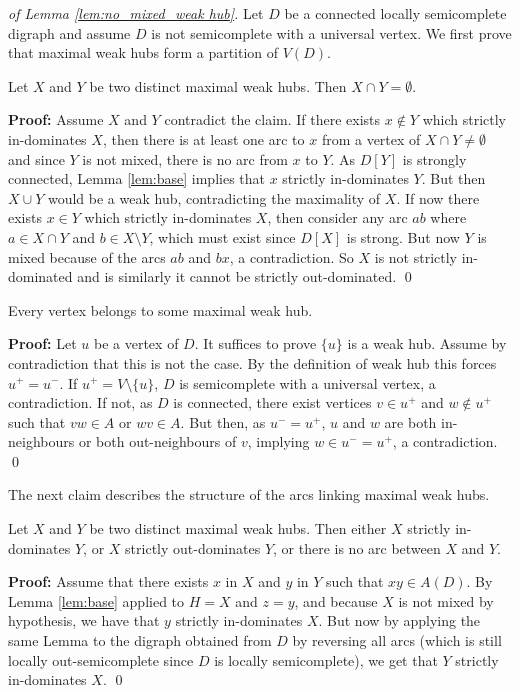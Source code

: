 \begin{proof}[of Lemma \ref{lem:no_mixed_weak hub}]
Let $D$ be a connected locally semicomplete digraph and assume $D$ is not semicomplete with a universal vertex. We first prove that maximal weak hubs form a partition of $V(D)$.


\begin{claim}\label{clm:weak hub_intersection}
Let $X$ and $Y$ be two distinct maximal weak hubs. Then $X \cap Y = \emptyset$.
\end{claim}

{\bf Proof:}
Assume $X$ and $Y$ contradict the claim. If there exists $x \notin Y$ which strictly in-dominates $X$, then there is at least one arc to $x$ from a vertex of $X \cap Y \neq \emptyset$ and since $Y$ is not mixed, there is no arc from $x$ to $Y$. As $D[Y]$ is strongly connected, Lemma \ref{lem:base} implies that $x$ strictly in-dominates $Y$. But then $X \cup Y$ would be a weak hub, contradicting the maximality of $X$.
If now there exists $x\in Y$ which strictly in-dominates $X$, then consider any arc $ab$ where $a\in X \cap Y$ and $b\in X\setminus Y$, which must exist since $D[X]$ is strong. But now $Y$ is mixed because of the arcs $ab$ and $bx$, a contradiction. 
So $X$ is not strictly in-dominated and is similarly it cannot be strictly out-dominated. 
\qed
\medskip
 
\begin{claim}\label{clm:weakhubcover}
Every vertex belongs to some maximal weak hub. 
\end{claim}
{\bf Proof:}
Let $u$ be a vertex of $D$. It suffices to prove  $\{u\}$ is a weak hub. Assume by contradiction that this is not the case. By the definition of weak hub this forces $u^+=u^-$. If $u^{+} = V \setminus \{u\}$, $D$ is semicomplete with a universal vertex, a contradiction. If not, as $D$ is connected, there exist vertices $v \in u^{+}$ and $w \notin u^{+}$ such that $vw \in A$ or $wv \in A$. But then, as $u^{-} = u^{+}$, $u$ and $w$ are both  in-neighbours or both out-neighbours of $v$,  implying $w \in u^{-} = u^{+}$, a contradiction. 
\qed

The next claim describes the structure of the arcs linking maximal weak hubs.
\begin{claim}\label{clm:weakhubinteract}
Let $X$ and $Y$ be two distinct maximal weak hubs. Then either $X$ strictly in-dominates $Y$, or $X$ strictly out-dominates $Y$, or there is no arc between $X$ and $Y$.
\end{claim}
{\bf Proof:}
Assume that there exists $x$ in $X$ and $y$ in $Y$ such that $xy\in A(D)$. By Lemma \ref{lem:base} applied to $H=X$ and $z=y$, and because $X$ is not mixed by hypothesis, we have that $y$ strictly in-dominates $X$. But now by applying the same Lemma to the digraph obtained from $D$ by reversing all arcs (which is still locally out-semicomplete since $D$ is locally semicomplete), we get that $Y$ strictly in-dominates $X$.
\qed


\end{proof}
